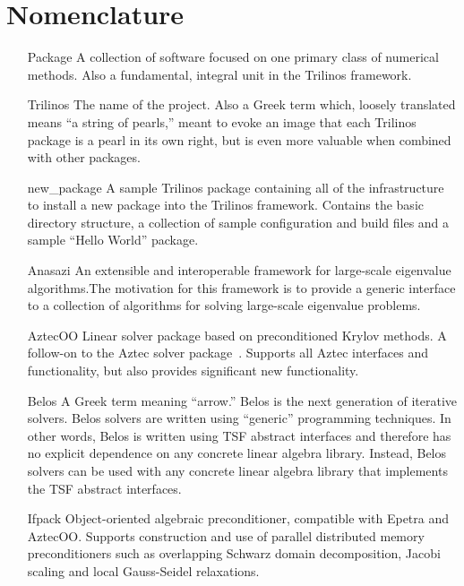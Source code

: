 \documentclass[12pt,strict]{TrilinosDevGuide}
\begin{document}
\section*{Nomenclature}
\begin{itemize}

\item[Package]
A collection of software focused on one primary class of numerical
methods.  Also a fundamental, integral unit in the Trilinos framework.

\item[Trilinos]
The name of the project.  Also a Greek term which,
loosely translated means ``a string of pearls,'' 
meant to evoke an image that each Trilinos package is a pearl in its 
own right, but is even more valuable when combined with other 
packages.

\item[new\_package] A sample Trilinos package containing all of the
infrastructure to install a new package into the Trilinos framework.
Contains the basic directory structure, a collection of sample
configuration and build files and a sample ``Hello World'' package.

\item[Anasazi]
An extensible and interoperable framework for large-scale eigenvalue
algorithms.The motivation for this framework is to provide a generic
interface to a collection of algorithms for solving large-scale 
eigenvalue problems.

\item[AztecOO] 
Linear solver package based on preconditioned Krylov methods.  A 
follow-on to the Aztec solver package~\cite{Aztec2.1}.  
Supports all Aztec 
interfaces and functionality, but also provides significant new 
functionality.

\item[Belos] A Greek term meaning ``arrow.'' Belos is the next
generation of iterative solvers.  Belos solvers are written using
``generic'' programming techniques.  In other words, Belos is written
using TSF abstract interfaces and therefore has no explicit dependence
on any concrete linear algebra library.  Instead, Belos solvers can be
used with any concrete linear algebra library that implements the TSF
abstract interfaces. 

\item[Ifpack] 
Object-oriented algebraic preconditioner, compatible with 
Epetra and AztecOO.  Supports construction and use of parallel
distributed memory preconditioners such as overlapping Schwarz domain
decomposition, Jacobi scaling and local Gauss-Seidel relaxations.


\end{itemize}
\end{document}

